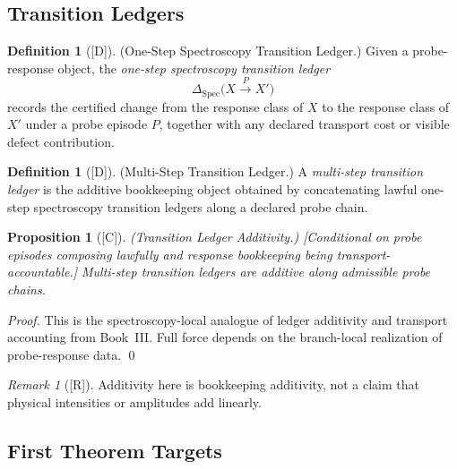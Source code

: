 \documentclass[12pt,oneside]{amsbook}
\theoremstyle{plain}
\newtheorem{proposition}[theorem]{Proposition}
\theoremstyle{definition}
\newtheorem{definition}[theorem]{Definition}
\theoremstyle{remark}
\newtheorem{remark}[theorem]{Remark}
\newcommand{\status}[1]{\textup{[#1]}}
\begin{document}
\subsection{Transition Ledgers}\label{sec:spec-transition-ledgers}

\begin{definition}[\status{D}]\label{def:one-step-transition-ledger}
\textup{(One-Step Spectroscopy Transition Ledger.)}
Given a probe-response object, the \emph{one-step spectroscopy transition
ledger}
\[
 \Delta_{\mathrm{Spec}}\!\bigl(X \xrightarrow{P} X'\bigr)
\]
records the certified change from the response class of $X$ to the
response class of $X'$ under a probe episode $P$, together with any
declared transport cost or visible defect contribution.
\end{definition}

\begin{definition}[\status{D}]\label{def:multistep-transition-ledger}
\textup{(Multi-Step Transition Ledger.)}
A \emph{multi-step transition ledger} is the additive bookkeeping object
obtained by concatenating lawful one-step spectroscopy transition ledgers
along a declared probe chain.
\end{definition}

\begin{proposition}[\status{C}]\label{prop:transition-ledger-additivity}
\textup{(Transition Ledger Additivity.)}
\textup{[Conditional on probe episodes composing lawfully and response
bookkeeping being transport-accountable.]}
Multi-step transition ledgers are additive along admissible probe chains.
\end{proposition}

\begin{proof}
This is the spectroscopy-local analogue of ledger additivity and transport
accounting from Book~III. Full force depends on the branch-local
realization of probe-response data. \qed
\end{proof}

\begin{remark}[\status{R}]\label{rem:additivity-scope}
Additivity here is bookkeeping additivity, not a claim that physical
intensities or amplitudes add linearly.
\end{remark}

\subsection{First Theorem Targets}\label{sec:spec-first-thms}
\end{document}
